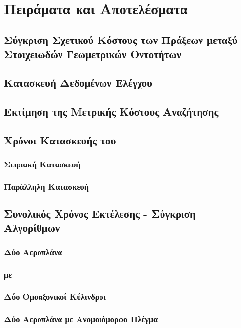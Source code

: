 \chapter{Πειράματα και Αποτελέσματα}
\label{ch:experiments}

\section{Σύγκριση Σχετικού Κόστους των Πράξεων μεταξύ Στοιχειωδών Γεωμετρικών Οντοτήτων}

\section{Κατασκευή Δεδομένων Ελέγχου}

\section{Εκτίμηση της Μετρικής Κόστους Αναζήτησης}

\section{Χρόνοι Κατασκευής του }
\subsection{Σειριακή Κατασκευή}
\subsection{Παράλληλη Κατασκευή}

\section{Συνολικός Χρόνος Εκτέλεσης - Σύγκριση Αλγορίθμων}
\subsection{Δύο Αεροπλάνα}
\subsection{ με }
\subsection{Δύο Ομοαξονικοί Κύλινδροι}
\subsection{Δύο Αεροπλάνα με Ανομοιόμορφο Πλέγμα}